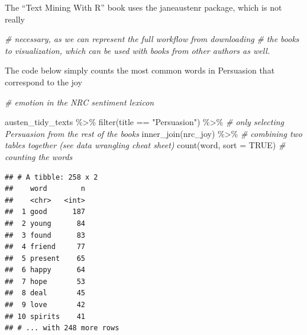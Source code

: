 \documentclass[
]{article}
\newenvironment{Shaded}{\begin{snugshade}}{\end{snugshade}}
\newcommand{\AttributeTok}[1]{\textcolor[rgb]{0.77,0.63,0.00}{#1}}
\newcommand{\CommentTok}[1]{\textcolor[rgb]{0.56,0.35,0.01}{\textit{#1}}}
\newcommand{\ConstantTok}[1]{\textcolor[rgb]{0.00,0.00,0.00}{#1}}
\newcommand{\FunctionTok}[1]{\textcolor[rgb]{0.00,0.00,0.00}{#1}}
\newcommand{\NormalTok}[1]{#1}
\newcommand{\SpecialCharTok}[1]{\textcolor[rgb]{0.00,0.00,0.00}{#1}}
\newcommand{\StringTok}[1]{\textcolor[rgb]{0.31,0.60,0.02}{#1}}
\begin{document}
The ``Text Mining With R'' book uses the janeaustenr package, which is
not really

\begin{Shaded}
\begin{Highlighting}[]
\CommentTok{\# necessary, as we can represent the full workflow from downloading}
\CommentTok{\# the books to visualization, which can be used with books from other authors as well.}
\end{Highlighting}
\end{Shaded}

The code below simply counts the most common words in Persuasion that
correspond to the joy

\begin{Shaded}
\begin{Highlighting}[]
\CommentTok{\# emotion in the NRC sentiment lexicon}
\end{Highlighting}
\end{Shaded}

\begin{Shaded}
\begin{Highlighting}[]
\NormalTok{austen\_tidy\_texts }\SpecialCharTok{\%\textgreater{}\%}
  \FunctionTok{filter}\NormalTok{(title }\SpecialCharTok{==} \StringTok{"Persuasion"}\NormalTok{) }\SpecialCharTok{\%\textgreater{}\%} \CommentTok{\# only selecting Persuasion from the rest of the books}
  \FunctionTok{inner\_join}\NormalTok{(nrc\_joy) }\SpecialCharTok{\%\textgreater{}\%} \CommentTok{\# combining two tables together (see data wrangling cheat sheet)}
  \FunctionTok{count}\NormalTok{(word, }\AttributeTok{sort =} \ConstantTok{TRUE}\NormalTok{) }\CommentTok{\# counting the words}
\end{Highlighting}
\end{Shaded}

\begin{verbatim}
## # A tibble: 258 x 2
##    word        n
##    <chr>   <int>
##  1 good      187
##  2 young      84
##  3 found      83
##  4 friend     77
##  5 present    65
##  6 happy      64
##  7 hope       53
##  8 deal       45
##  9 love       42
## 10 spirits    41
## # ... with 248 more rows
\end{verbatim}
\end{document}

